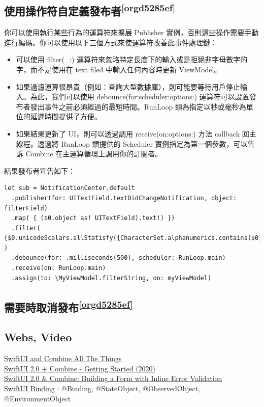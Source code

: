\documentclass[a4paper,12pt]{article}
\begin{document}
\subsection{使用操作符自定義發布者\textsuperscript{\ref{orgd5285ef}}}
\label{sec:orge550b6e}
你可以使用執行某些行為的運算符來擴展 Publisher 實例，否則這些操作需要手動進行編碼。你可以使用以下三個方式來使運算符改善此事件處理鏈：\\
\begin{itemize}
\item 可以使用 filter(\_:) 運算符來忽略特定長度下的輸入或是拒絕非字母數字的字，而不是使用在 text filed 中輸入任何內容時更新 ViewModel。\\
\item 如果過濾運算很昂貴（例如：查詢大型數據庫），則可能要等待用戶停止輸入。為此，我們可以使用 debounce(for:scheduler:options:) 運算符可以設置發布者發出事件之前必須經過的最短時間。RunLoop 類為指定以秒或毫秒為單位的延遲時間提供了方便。\\
\item 如果結果更新了 UI，則可以透過調用 receive(on:options:) 方法 callback 回主線程。透過將 RunLoop 類提供的 Scheduler 實例指定為第一個參數，可以告訴 Combine 在主運算循環上調用你的訂閱者。\\
\end{itemize}
結果發布者宣告如下：\\
\lstset{breaklines=true,language=swift,label= ,caption= ,captionpos=b,firstnumber=1,numbers=left}
\begin{lstlisting}
let sub = NotificationCenter.default
  .publisher(for: UITextField.textDidChangeNotification, object: filterField)
  .map( { ($0.object as! UITextField).text!) })
  .filter( {$0.unicodeScalars.allStatisfy({CharacterSet.alphanumerics.contains($0)})} )
  .debounce(for: .milliseconds(500), scheduler: RunLoop.main)
  .receive(on: RunLoop.main)
  .assign(to: \MyViewModel.filterString, on: myViewModel)
\end{lstlisting}
\subsection{需要時取消發布\textsuperscript{\ref{orgd5285ef}}}
\label{sec:orgd61ac1d}
\subsection{Webs, Video}
\label{sec:orgcbb5aa3}
\href{https://www.youtube.com/watch?v=r7ef2W3kevY}{SwiftUI and Combine All The Things}\\
\href{https://www.youtube.com/watch?v=bRpFHqv0tRQ}{SwiftUI 2.0 + Combine - Getting Started (2020)}\\
\href{https://www.youtube.com/watch?v=YJRApch2cc4}{SwiftUI 2.0 \& Combine: Building a Form with Inline Error Validation}\\
\href{https://www.youtube.com/watch?v=IBelvWwZkJw}{SwiftUI Binding} : @Binding, @StateObject, @ObservedObject, @EnvironmentObject\\
\end{document}
